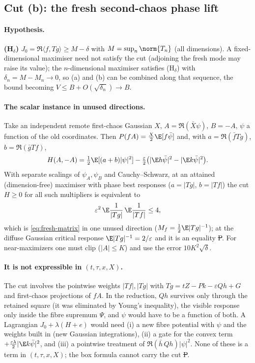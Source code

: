 \subsection{Cut (b): the fresh second-chaos phase lift}\label{sec:nearmax-lift}
\paragraph{Hypothesis.} \textbf{(H$_\delta$)} $J_0=\Re\langle f,Tg\rangle\ge M-\delta$ with $M=\sup_n\norm{T_n}$ (all dimensions). A fixed-dimensional maximiser need not satisfy the
cut (adjoining the fresh mode may raise its value); the $n$-dimensional maximiser satisfies (H$_\delta$) with $\delta_n=M-M_n\to0$, so (a) and (b) can be combined along that
sequence, the bound becoming $V\le B+O(\sqrt{\delta_n})\to B$.

\paragraph{The scalar instance in unused directions.} Take an independent remote first-chaos Gaussian $X$, $A=\Re(\bar X\psi)$, $B=-A$, $\psi$ a function of the old coordinates.
Then $P(fA)=\tfrac X2\E[f\bar\psi]$ and, with $a=\Re(\bar fTg)$, $b=\Re(\bar gTf)$,
\[
H(A,-A)=\tfrac12\E[(a+b)|\psi|^2]-\tfrac\varepsilon2\bigl(|\E h\bar\psi|^2-|\E k\bar\psi|^2\bigr).
\]
With separate scalings of $\psi_A,\psi_B$ and Cauchy--Schwarz, at an attained (dimension-free) maximiser with phase best responses ($a=|Tg|$, $b=|Tf|$) the cut
$H\ge0$ for all such multipliers is equivalent to
\begin{equation}\label{eq:nm-scalar}
\varepsilon^2\,\E\frac1{|Tg|}\,\E\frac1{|Tf|}\le4 ,
\end{equation}
which is \eqref{eq:fresh-matrix} in one unused direction ($M_f=\tfrac12\E|Tg|^{-1}$); at the diffuse Gaussian critical response $\E|Tg|^{-1}=2/\varepsilon$ and it is an equality
\st{P}. For near-maximizers one must clip ($|A|\le K$) and use the error $10K^2\sqrt\delta$.

\paragraph{It is not expressible in $(t,\tau,x,X)$.} The cut involves the pointwise weights $|Tf|,|Tg|$ with $Tg=tZ-Pk-\varepsilon Qh+G$ and first-chaos projections of $fA$. In the
reduction, $Qh$ survives only through the retained square (it was eliminated by Young's inequality), the visible response only inside the fibre supremum $\Psi$, and $\psi$ would have
to be a function of both. A Lagrangian $J_0+\lambda(H+e)$ would need (i) a new fibre potential with $\psi$ and the weights built in (new Gaussian integrations), (ii) a gate for the convex
term $+\tfrac{\varepsilon\lambda}2|\E k\bar\psi|^2$, and (iii) a pointwise treatment of $\Re(\bar h\,Qh)|\psi|^2$. None of these is a term in $(t,\tau,x,X)$; the box formula cannot carry
the cut \st{P}.

